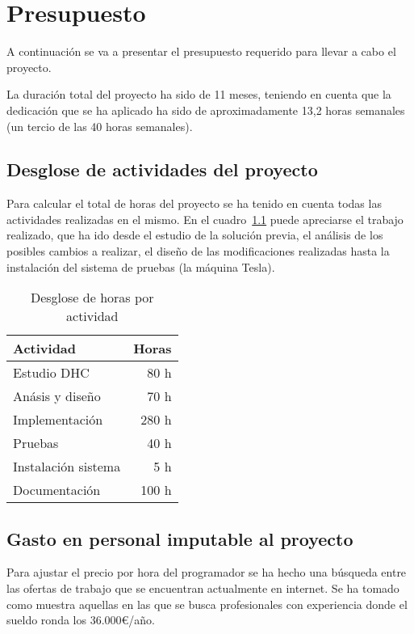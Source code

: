 \chapter{Presupuesto}

A continuación se va a presentar el presupuesto requerido para llevar a cabo el proyecto.

La duración total del proyecto ha sido de 11 meses, teniendo en cuenta que la dedicación que se ha aplicado ha sido de aproximadamente 13,2 horas semanales (un tercio de las 40 horas semanales).

\section{Desglose de actividades del proyecto}

Para calcular el total de horas del proyecto se ha tenido en cuenta todas las actividades realizadas en el mismo. En el cuadro~\ref{tab:des_horas} puede apreciarse el trabajo realizado, que ha ido desde el estudio de la solución previa, el análisis de los posibles cambios a realizar, el diseño de las modificaciones realizadas hasta la instalación del sistema de pruebas (la máquina Tesla).

\begin{table}
	\centering
	
	\begin{tabular}{|l|r|}
		\hline
		Actividad & Horas \\
		\hline
		Estudio DHC & 80 h \\
		\hline
		Anásis y diseño & 70 h \\
		\hline
		Implementación & 280 h \\
		\hline
		Pruebas & 40 h \\
		\hline
		Instalación sistema & 5 h \\
		\hline
		Documentación & 100 h \\
		\hline
	\end{tabular}
	\caption{Desglose de horas por actividad}\label{tab:des_horas}
\end{table}

\section{Gasto en personal imputable al proyecto}

Para ajustar el precio por hora del programador se ha hecho una búsqueda entre las ofertas de trabajo que se encuentran actualmente en internet. Se ha tomado como muestra aquellas en las que se busca profesionales con experiencia donde el sueldo ronda los 36.000\euro/año.

